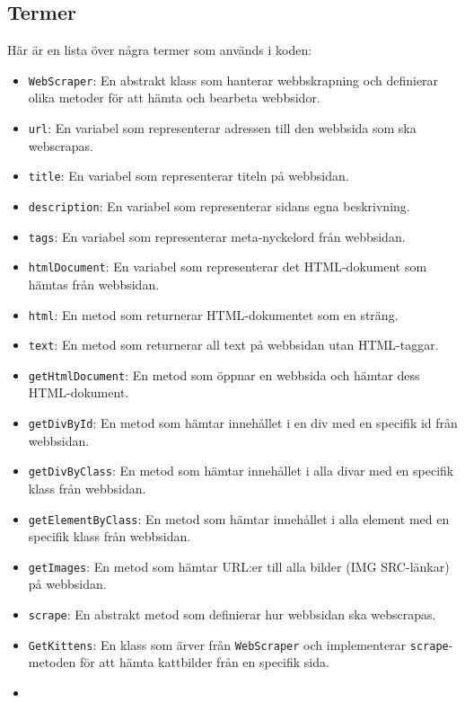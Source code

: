 \hypertarget{termer}{%
\subsection{Termer}\label{termer}}

Här är en lista över några termer som används i koden:

\begin{itemize}
\tightlist
\item
  \texttt{WebScraper}: En abstrakt klass som hanterar webbskrapning och
  definierar olika metoder för att hämta och bearbeta webbsidor.
\item
  \texttt{url}: En variabel som representerar adressen till den webbsida
  som ska webscrapas.
\item
  \texttt{title}: En variabel som representerar titeln på webbsidan.
\item
  \texttt{description}: En variabel som representerar sidans egna
  beskrivning.
\item
  \texttt{tags}: En variabel som representerar meta-nyckelord från
  webbsidan.
\item
  \texttt{htmlDocument}: En variabel som representerar det HTML-dokument
  som hämtas från webbsidan.
\item
  \texttt{html}: En metod som returnerar HTML-dokumentet som en sträng.
\item
  \texttt{text}: En metod som returnerar all text på webbsidan utan
  HTML-taggar.
\item
  \texttt{getHtmlDocument}: En metod som öppnar en webbsida och hämtar
  dess HTML-dokument.
\item
  \texttt{getDivById}: En metod som hämtar innehållet i en div med en
  specifik id från webbsidan.
\item
  \texttt{getDivByClass}: En metod som hämtar innehållet i alla divar
  med en specifik klass från webbsidan.
\item
  \texttt{getElementByClass}: En metod som hämtar innehållet i alla
  element med en specifik klass från webbsidan.
\item
  \texttt{getImages}: En metod som hämtar URL:er till alla bilder (IMG
  SRC-länkar) på webbsidan.
\item
  \texttt{scrape}: En abstrakt metod som definierar hur webbsidan ska
  webscrapas.
\item
  \texttt{GetKittens}: En klass som ärver från \texttt{WebScraper} och
  implementerar \texttt{scrape}-metoden för att hämta kattbilder från en
  specifik sida.
\item

\end{itemize}
